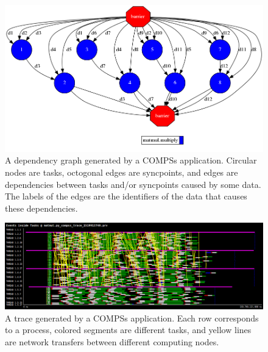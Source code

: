 \begin{figure}[ht!]
\centering
\includegraphics[scale = 0.45]{figures/2x2_matmul_graph.png}
\caption{A dependency graph generated by a COMPSs application. Circular nodes are tasks, octogonal edges are syncpoints, and edges are dependencies between tasks and/or syncpoints caused by some data. The labels of the edges are the identifiers of the data that causes these dependencies.}
\label{fig:graph_example}
\end{figure}

\begin{figure}[ht!]
\centering
\includegraphics[scale = 0.3]{figures/matmul_trace.png}
\caption{A trace generated by a COMPSs application. Each row corresponds to a process, colored segments are different tasks, and yellow lines are network transfers between different computing nodes.}
\label{fig:trace_example}
\end{figure}




